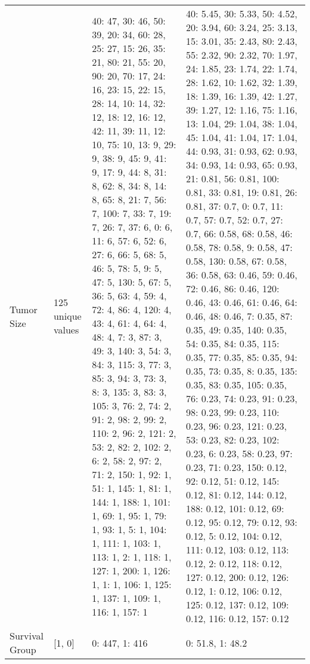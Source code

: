 \begin{tabular}{llll}
Tumor Size & 125 unique values & {40: 47, 30: 46, 50: 39, 20: 34, 60: 28, 25: 27, 15: 26, 35: 21, 80: 21, 55: 20, 90: 20, 70: 17, 24: 16, 23: 15, 22: 15, 28: 14, 10: 14, 32: 12, 18: 12, 16: 12, 42: 11, 39: 11, 12: 10, 75: 10, 13: 9, 29: 9, 38: 9, 45: 9, 41: 9, 17: 9, 44: 8, 31: 8, 62: 8, 34: 8, 14: 8, 65: 8, 21: 7, 56: 7, 100: 7, 33: 7, 19: 7, 26: 7, 37: 6, 0: 6, 11: 6, 57: 6, 52: 6, 27: 6, 66: 5, 68: 5, 46: 5, 78: 5, 9: 5, 47: 5, 130: 5, 67: 5, 36: 5, 63: 4, 59: 4, 72: 4, 86: 4, 120: 4, 43: 4, 61: 4, 64: 4, 48: 4, 7: 3, 87: 3, 49: 3, 140: 3, 54: 3, 84: 3, 115: 3, 77: 3, 85: 3, 94: 3, 73: 3, 8: 3, 135: 3, 83: 3, 105: 3, 76: 2, 74: 2, 91: 2, 98: 2, 99: 2, 110: 2, 96: 2, 121: 2, 53: 2, 82: 2, 102: 2, 6: 2, 58: 2, 97: 2, 71: 2, 150: 1, 92: 1, 51: 1, 145: 1, 81: 1, 144: 1, 188: 1, 101: 1, 69: 1, 95: 1, 79: 1, 93: 1, 5: 1, 104: 1, 111: 1, 103: 1, 113: 1, 2: 1, 118: 1, 127: 1, 200: 1, 126: 1, 1: 1, 106: 1, 125: 1, 137: 1, 109: 1, 116: 1, 157: 1} & {40: 5.45, 30: 5.33, 50: 4.52, 20: 3.94, 60: 3.24, 25: 3.13, 15: 3.01, 35: 2.43, 80: 2.43, 55: 2.32, 90: 2.32, 70: 1.97, 24: 1.85, 23: 1.74, 22: 1.74, 28: 1.62, 10: 1.62, 32: 1.39, 18: 1.39, 16: 1.39, 42: 1.27, 39: 1.27, 12: 1.16, 75: 1.16, 13: 1.04, 29: 1.04, 38: 1.04, 45: 1.04, 41: 1.04, 17: 1.04, 44: 0.93, 31: 0.93, 62: 0.93, 34: 0.93, 14: 0.93, 65: 0.93, 21: 0.81, 56: 0.81, 100: 0.81, 33: 0.81, 19: 0.81, 26: 0.81, 37: 0.7, 0: 0.7, 11: 0.7, 57: 0.7, 52: 0.7, 27: 0.7, 66: 0.58, 68: 0.58, 46: 0.58, 78: 0.58, 9: 0.58, 47: 0.58, 130: 0.58, 67: 0.58, 36: 0.58, 63: 0.46, 59: 0.46, 72: 0.46, 86: 0.46, 120: 0.46, 43: 0.46, 61: 0.46, 64: 0.46, 48: 0.46, 7: 0.35, 87: 0.35, 49: 0.35, 140: 0.35, 54: 0.35, 84: 0.35, 115: 0.35, 77: 0.35, 85: 0.35, 94: 0.35, 73: 0.35, 8: 0.35, 135: 0.35, 83: 0.35, 105: 0.35, 76: 0.23, 74: 0.23, 91: 0.23, 98: 0.23, 99: 0.23, 110: 0.23, 96: 0.23, 121: 0.23, 53: 0.23, 82: 0.23, 102: 0.23, 6: 0.23, 58: 0.23, 97: 0.23, 71: 0.23, 150: 0.12, 92: 0.12, 51: 0.12, 145: 0.12, 81: 0.12, 144: 0.12, 188: 0.12, 101: 0.12, 69: 0.12, 95: 0.12, 79: 0.12, 93: 0.12, 5: 0.12, 104: 0.12, 111: 0.12, 103: 0.12, 113: 0.12, 2: 0.12, 118: 0.12, 127: 0.12, 200: 0.12, 126: 0.12, 1: 0.12, 106: 0.12, 125: 0.12, 137: 0.12, 109: 0.12, 116: 0.12, 157: 0.12} \\
Survival Group & [1, 0] & {0: 447, 1: 416} & {0: 51.8, 1: 48.2} \\
\bottomrule
\end{tabular}

